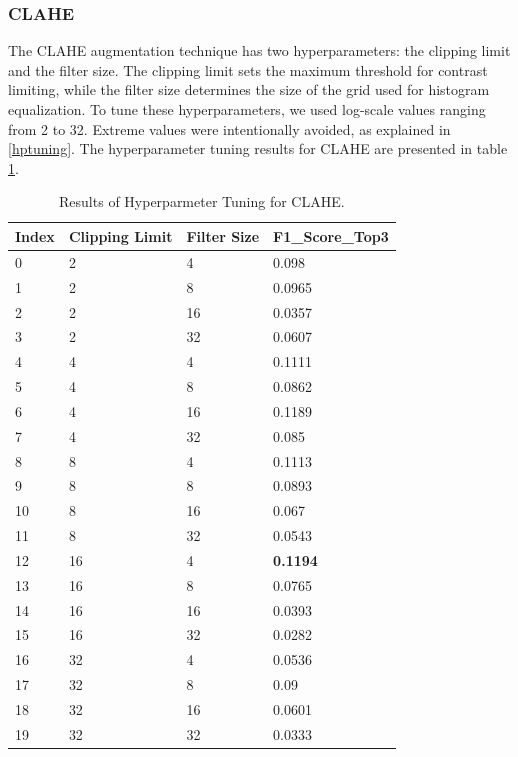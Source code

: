 \subsubsection{CLAHE}
The CLAHE augmentation technique has two hyperparameters: the clipping limit and the filter size. The clipping limit sets the maximum threshold for contrast limiting, while the filter size determines the size of the grid used for histogram equalization. To tune these hyperparameters, we used log-scale values ranging from 2 to 32. Extreme values were intentionally avoided, as explained in \ref{hptuning}. The hyperparameter tuning results for CLAHE are presented in table \ref{tab:clahe_hp}. 
\begin{table}[ht]
    \centering
    \caption{Results of Hyperparmeter Tuning for CLAHE.}
    \begin{tabular}{llll}
    \toprule
        Index & Clipping Limit & Filter Size & F1\_Score\_Top3 \\ \midrule 
        0 & 2 & 4 & 0.098 \\ 
        1 & 2 & 8 & 0.0965 \\ 
        2 & 2 & 16 & 0.0357 \\ 
        3 & 2 & 32 & 0.0607 \\ 
        4 & 4 & 4 & 0.1111 \\ 
        5 & 4 & 8 & 0.0862 \\ 
        6 & 4 & 16 & 0.1189 \\ 
        7 & 4 & 32 & 0.085 \\ 
        8 & 8 & 4 & 0.1113 \\ 
        9 & 8 & 8 & 0.0893 \\ 
        10 & 8 & 16 & 0.067 \\ 
        11 & 8 & 32 & 0.0543 \\
        12 & 16 & 4 & \textbf{0.1194} \\ 
        13 & 16 & 8 & 0.0765 \\ 
        14 & 16 & 16 & 0.0393 \\ 
        15 & 16 & 32 & 0.0282 \\ 
        16 & 32 & 4 & 0.0536 \\ 
        17 & 32 & 8 & 0.09 \\ 
        18 & 32 & 16 & 0.0601 \\ 
        19 & 32 & 32 & 0.0333 \\ 
    \bottomrule
    \end{tabular}
    \label{tab:clahe_hp}
\end{table}

